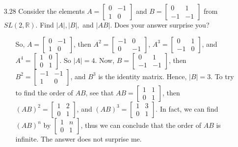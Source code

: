 \documentclass[12pt]{article}
\begin{document}
\begin{enumerate}
\item[3.28] Consider the elements $A = \left[ \begin{array}{cc} 0 & -1 \\ 1 & 0 \end{array}
\right]$ and $B = \left[ \begin{array}{cc} 0 & 1 \\ -1 & -1 \end{array} \right]$ from
$SL(2, \mathbb{R})$. Find $|A|, |B|,$ and $|AB|$. Does your answer surprise you?
\begin{enumerate}
\item[] So, $A = \left[ \begin{array}{cc} 0 & -1 \\ 1 & 0 \end{array} \right]$, then
$A^2 = \left[ \begin{array}{cc} -1 & 0 \\ 0 & -1 \end{array} \right]$, 
$A^3 = \left[ \begin{array}{cc} 0 & 1 \\ -1 & 0 \end{array} \right]$, and
$A^4 = \left[ \begin{array}{cc} 1 & 0 \\ 0 & 1 \end{array} \right]$. So $|A| = 4$. 
Now, $B = \left[ \begin{array}{cc} 0 & 1 \\ -1 & -1 \end{array} \right]$, then
$B^2 = \left[ \begin{array}{cc} -1 & -1 \\ 1 & 0 \end{array} \right]$, and
$B^3$ is the identity matrix. Hence, $|B| = 3$. To try to find the order of $AB$, see that 
$AB = \left[ \begin{array}{cc} 1 & 1 \\ 0 & 1 \end{array} \right]$, then 
$(AB)^2 = \left[ \begin{array}{cc} 1 & 2 \\ 0 & 1 \end{array} \right]$, and
$(AB)^3 = \left[ \begin{array}{cc} 1 & 3 \\ 0 & 1 \end{array} \right]$. In fact,
we can find $(AB)^n$ by $\left[ \begin{array}{cc} 1 & n \\ 0 & 1 \end{array} \right]$,
thus we can conclude that the order of $AB$ is infinite. The answer does not surprise me.
\end{enumerate}


\end{enumerate}
\end{document}
